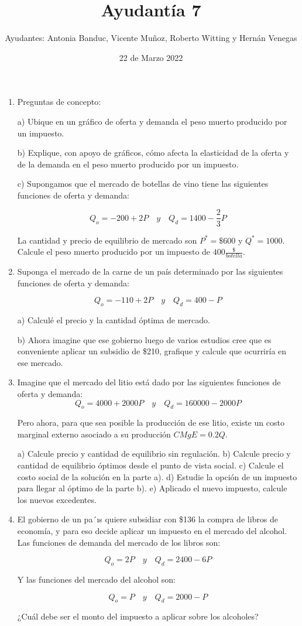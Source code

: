 \documentclass{article}
\title{Ayudantía 7}
\author{Ayudantes: Antonia Banduc, Vicente Muñoz,
Roberto Witting y Hernán Venegas
}
\begin{document}
\date{22 de Marzo 2022}
\maketitle

\begin{enumerate}
\item Preguntas de concepto:

a) Ubique en un gráfico de oferta y demanda el peso muerto producido por un impuesto.

b) Explique, con apoyo de gráficos, cómo afecta la elasticidad de la oferta y de la demanda en el peso muerto producido por un impuesto.

c) Supongamos que el mercado de botellas de vino tiene las siguientes funciones de oferta y
demanda:

$$Q_o =-200+2P \quad y\quad Q_d=1400-\frac{2}{3}P$$

La cantidad y precio de equilibrio de mercado son $P^*=\$600$ y  $Q^*=1000$. Calcule el peso muerto producido por un impuesto de $400\frac{\$}{botella}$.

\item Suponga el mercado de la carne de un país determinado por las siguientes funciones de oferta y demanda:

$$Q_o =-110+2P \quad y\quad Q_d=400-P$$

a) Calculé el precio y la cantidad óptima de mercado.

b) Ahora imagine que ese gobierno luego de varios estudios cree que es conveniente aplicar un subsidio de
\$210, grafique y calcule que ocurriría en ese mercado.

\item Imagine que el mercado del litio está dado por las siguientes funciones de oferta y demanda:
$$Q_o =4000+2000P \quad y\quad Q_d=160000-2000P$$

Pero ahora, para que sea posible la producción de ese litio, existe un costo marginal externo asociado a
su producción $CMgE = 0.2Q$.

a) Calcule precio y cantidad de equilibrio sin regulación.
b) Calcule precio y cantidad de equilibrio óptimos desde el punto de vista social.
c) Calcule el costo social de la solución en la parte a).
d) Estudie la opción de un impuesto para llegar al óptimo de la parte b).
e) Aplicado el nuevo impuesto, calcule los nuevos excedentes.

\item El gobierno de un pa´ıs quiere subsidiar con \$136 la compra de libros de economía, y para eso decide
aplicar un impuesto en el mercado del alcohol. Las funciones de demanda del mercado de los libros son:

$$Q_o =2P \quad y\quad Q_d=2400-6P$$

Y las funciones del mercado del alcohol son:

$$Q_o =P \quad y\quad Q_d=2000-P$$

¿Cuál debe ser el monto del impuesto a aplicar sobre los alcoholes?




\end{enumerate}
\end{document}
